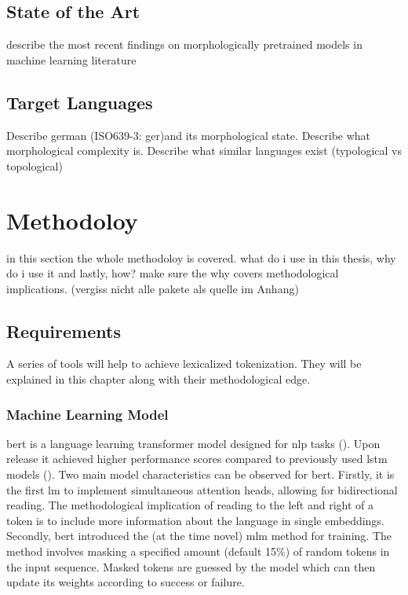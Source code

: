 \documentclass[english]{ttlab-qualify}
\begin{document}
    \section{State of the Art}
    \label{sec:state-of-the-art}
    describe the most recent findings on morphologically pretrained models in machine learning literature

    \section{Target Languages}
    \label{sec:target-languages}
    Describe german (ISO639-3: ger)and its morphological state.
    Describe what morphological complexity is.
    Describe what similar languages exist (typological vs topological)

    \chapter{Methodoloy}
    \label{ch:methodology}
    in this section the whole methodoloy is covered. what do i use in this thesis, why do i use it and lastly, how?
    make sure the why covers methodological implications. (vergiss nicht alle pakete als quelle im Anhang)

    \section{Requirements}
    \label{sec:requirements}
    A series of tools will help to achieve lexicalized tokenization.
    They will be explained in this chapter along with their methodological edge.

    \subsection{Machine Learning Model}
    \label{subsec:mlm}

    \ac{bert} is a language learning transformer model designed for \ac{nlp} tasks (\cite{ATTENTION}).
    Upon release it achieved higher performance scores compared to previously used \ac{lstm} models (\cite{BERTHIGH1}).
    Two main model characteristics can be observed for \ac{bert}.
    Firstly, it is the first \ac{lm} to implement simultaneous attention heads, allowing for bidirectional reading.
    The methodological implication of reading to the left and right of a token is to include more information about the language in single embeddings.
    Secondly, \ac{bert} introduced the (at the time novel) \ac{mlm} method for training.
    The method involves masking a specified amount (default 15\%) of random tokens in the input sequence.
    Masked tokens are guessed by the model which can then update its weights according to success or failure.
\end{document}
